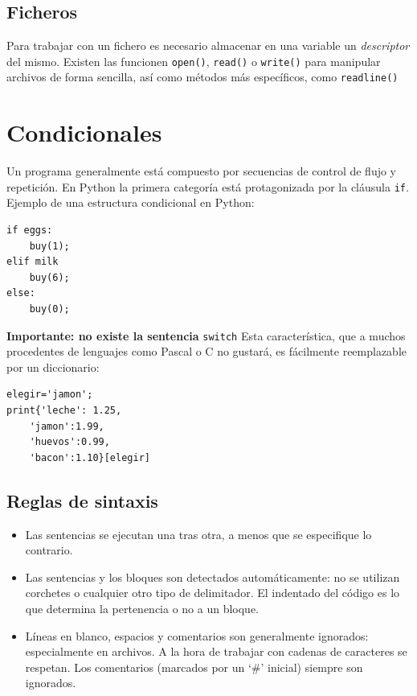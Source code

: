 \documentclass[12pt]{article} %
\begin{document}
\subsection{Ficheros}
Para trabajar con un fichero es necesario almacenar en una variable un \textit{descriptor} del mismo. Existen las funcionen \verb+open()+, \verb+read()+ o \verb+write()+ para manipular archivos de forma sencilla, así como métodos más específicos, como \verb+readline()+


\section{Condicionales}
Un programa generalmente está compuesto por secuencias de control de flujo y repetición. En Python la primera categoría está protagonizada por la cláusula \verb+if+.
Ejemplo de una estructura condicional en Python:
\begin{lstlisting}[frame=single, showspaces=false]
if eggs:
	buy(1);
elif milk
	buy(6);
else:
	buy(0);
\end{lstlisting}
\Large \textbf{Importante: no existe la sentencia} \verb+switch+
Esta característica, que a muchos procedentes de lenguajes como Pascal o C no gustará, es fácilmente reemplazable por un diccionario:
\begin{lstlisting}[frame=single, showspaces=false]
elegir='jamon';
print{'leche': 1.25,
	'jamon':1.99,
	'huevos':0.99,
	'bacon':1.10}[elegir]
\end{lstlisting}
\subsection{Reglas de sintaxis}
\begin{itemize}
	\item Las sentencias se ejecutan una tras otra, a menos que se especifique lo contrario.
	\item Las sentencias y los bloques son detectados automáticamente: no se utilizan corchetes o cualquier otro tipo de delimitador. El indentado del código es lo que determina la pertenencia o no a un bloque.
	\item Líneas en blanco, espacios y comentarios son generalmente ignorados: especialmente en archivos. A la hora de trabajar con cadenas de caracteres se respetan. Los comentarios (marcados por un `\#' inicial) siempre son ignorados.
\end{itemize}
\end{document}
